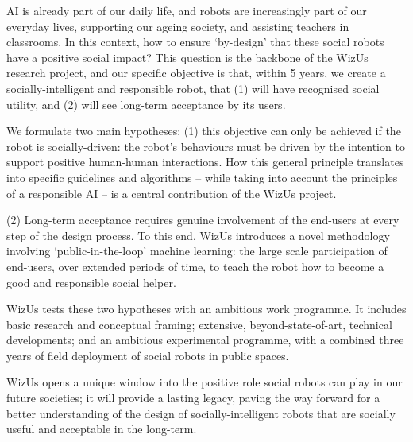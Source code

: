 \documentclass[11pt,a4paper]{report}
\newcommand{\project}{WizUs\xspace}
\begin{document}
AI is already part of our daily life, and robots are increasingly part of our
everyday lives, supporting our ageing society, and assisting teachers in
classrooms. In this context, how to ensure `by-design' that these social robots
have a positive social impact? This question is the backbone of the \project
research project, and our specific objective is that, within 5 years, we create
a socially-intelligent and responsible robot, that (1) will have recognised
social utility, and (2) will see long-term acceptance by its users.

We formulate two main hypotheses: (1) this objective can only be achieved if the
robot is socially-driven: the robot's behaviours must be driven by the intention
to support positive human-human interactions. How this general principle
translates into specific guidelines and algorithms -- while taking into account
the principles of a responsible AI -- is a central contribution of the \project
project.

(2) Long-term acceptance requires genuine involvement of the end-users at every
step of the design process. To this end, \project introduces a novel methodology
involving `public-in-the-loop' machine learning: the large scale participation
of end-users, over extended periods of time, to teach the robot how to become a
good and responsible social helper.

\project tests these two hypotheses with an ambitious work programme. It includes
basic research and conceptual framing; extensive, beyond-state-of-art, technical
developments; and an ambitious experimental programme, with a combined three
years of field deployment of social robots in public spaces.

\project opens a unique window into the positive role social robots can play in our
future societies; it will provide a lasting legacy, paving the way forward for a
better understanding of the design of socially-intelligent robots that are
socially useful and acceptable in the long-term.




\newpage


\pagebreak

\end{document}
